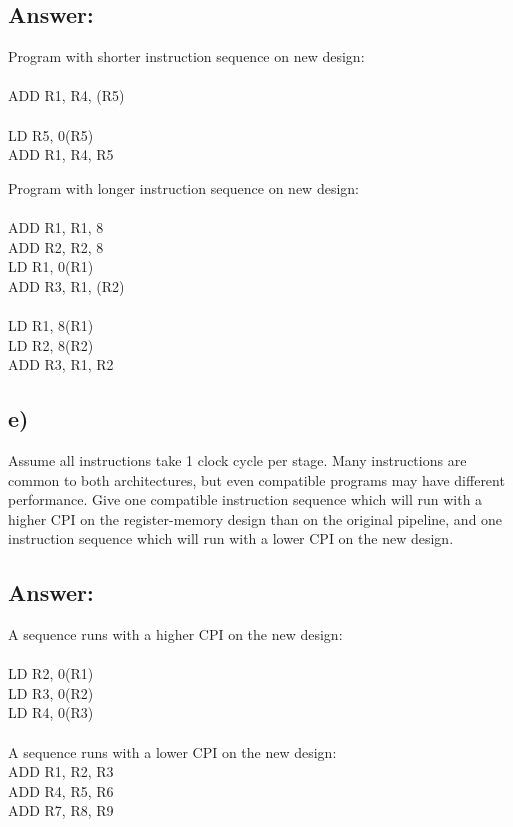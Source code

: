 \documentclass[letter,11pt,leqno]{article}
\begin{document}
\subsection*{Answer:}

Program with shorter instruction sequence on new design:\\
\\
ADD R1, R4, (R5)\\
\\
LD R5, 0(R5)\\
ADD R1, R4, R5

Program with longer instruction sequence on new design:\\
\\
ADD R1, R1, 8\\
ADD R2, R2, 8\\
LD R1, 0(R1)\\
ADD R3, R1, (R2)\\
\\
LD R1, 8(R1)\\
LD R2, 8(R2)\\
ADD R3, R1, R2


\subsection*{e)}Assume all instructions take 1 clock cycle per stage. Many instructions are common to both architectures, but even compatible programs may have different performance. Give one compatible instruction sequence which will run with a higher CPI on the register-memory design than on the original pipeline, and one instruction sequence which will run with a lower CPI on the new design.

\subsection*{Answer:}

A sequence runs with a higher CPI on the new design:\\\
\\
LD R2, 0(R1)\\
LD R3, 0(R2)\\
LD R4, 0(R3)\\
\\
A sequence runs with a lower CPI on the new design:\\
ADD R1, R2, R3\\
ADD R4, R5, R6\\
ADD R7, R8, R9
\end{document}
